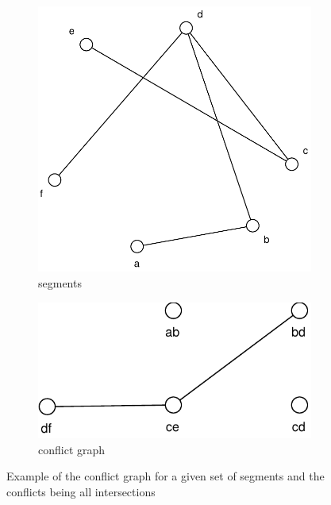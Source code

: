 \begin{figure}[ht]
  \centering
  \begin{subfigure}{0.4\textwidth}
          \centering
          \includegraphics[width=\textwidth]{img/example_conflict_graph_segments.pdf}
          \caption{segments}
  \end{subfigure}
  \hspace{2em}
  \VRule
  \hspace{2em}
  \begin{subfigure}{0.4\textwidth}
          \centering
          \includegraphics[width=\textwidth]{img/example_conflict_graph.pdf}
          \caption{conflict graph}
  \end{subfigure}  
  \caption{Example of the conflict graph for a given set of segments %
    and the conflicts being all intersections}
\end{figure}

